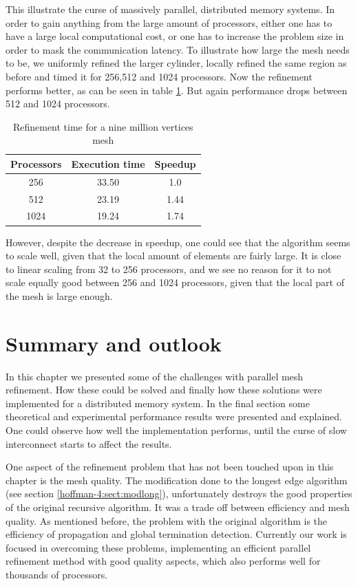 This illustrate the curse of massively parallel, distributed memory
systems. In order to gain anything from the large amount of
processors, either one has to have a large local computational cost,
or one has to increase the problem size in order to mask the communication
latency. To illustrate how large the mesh needs to be, we uniformly
refined the larger cylinder, locally refined the same region as before
and timed it for 256,512 and 1024 processors. Now the refinement
performs better, as can be seen in table \ref{hoffman-4:tab:reftime}. But
again performance drops between 512 and 1024 processors.
\begin{table}[t]
  \begin{center}
    \begin{tabular}{|c|c|c|}
      \hline
      Processors & Execution time & Speedup \\
      \hline
      256 & 33.50 & 1.0 \\
      512 & 23.19 & 1.44 \\
      1024 & 19.24 & 1.74 \\
      \hline
    \end{tabular}
    \caption{Refinement time for a nine million vertices mesh}
    \label{hoffman-4:tab:reftime}
  \end{center}
\end{table}

However, despite the decrease in speedup, one could see that the
algorithm seems to scale well, given that the local amount of elements
are fairly large. It is close to linear scaling from 32 to 256
processors, and we see no reason for it to not scale equally good
between 256 and 1024 processors, given that the local part of the mesh
is large enough.

\section{Summary and outlook}

In this chapter we presented some of the challenges with parallel mesh
refinement. How these could be solved and finally how these solutions
were implemented for a distributed memory system. In the final section
some theoretical and experimental performance results were presented
and explained. One could observe how well the implementation performs,
until the curse of slow interconnect starts to affect the results.

One aspect of the refinement problem that has not been touched upon in
this chapter is the mesh quality. The modification done to the longest
edge algorithm (see section \ref{hoffman-4:sect:modlong}), unfortunately
destroys the good properties of the original recursive algorithm. It
was a trade off between efficiency and mesh quality. As mentioned
before, the problem with the original algorithm is the efficiency of
propagation and global termination detection. Currently our work is
focused in overcoming these problems, implementing an efficient
parallel refinement method with good quality aspects, which also
performs well for thousands of processors.
